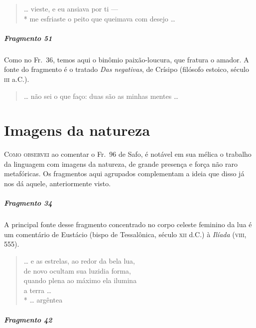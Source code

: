 \begin{verse}
\ldots{} vieste, e eu ansiava por ti --- \\*
me esfriaste o peito que queimava com desejo \ldots{}
\end{verse}
\pagebreak

\paragraph{Fragmento 51}

{\small Como no Fr.~36, temos aqui o binômio paixão-loucura, que fratura o amador. A
fonte do fragmento é o tratado \textit{Das negativas}, de Crísipo (filósofo
estoico, século \textsc{iii} a.C.).}   \EP[]

\begin{verse}
\ldots{} não sei o que faço: duas são as minhas mentes \ldots{}
\end{verse}

\chapter{Imagens da natureza}

\textsc{Como observei} ao comentar o Fr.~96 de Safo, é notável em sua mélica o trabalho
da linguagem com imagens da natureza, de grande presença e força não raro
metafóricas. Os fragmentos aqui agrupados complementam a ideia que disso já nos
dá aquele, anteriormente visto.

\paragraph{Fragmento 34}

{\small A principal fonte desse fragmento concentrado no corpo celeste feminino da lua é
um comentário de Eustácio (bispo de Tessalônica, século \textsc{xii} d.C.) à
\textit{Ilíada }(\textsc{viii}, 555).}

\begin{verse}
\ldots{} e as estrelas, ao redor da bela lua,\\
de novo ocultam sua luzidia forma,\\
quando plena ao máximo ela ilumina\\
a terra \ldots{} \\*
\ldots{} argêntea
\end{verse}

\paragraph{Fragmento 42}

